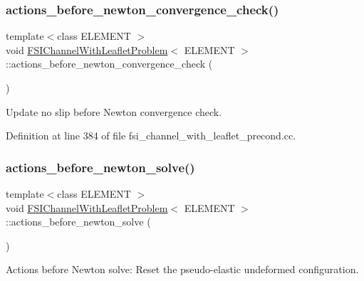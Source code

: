 \subsubsection{\texorpdfstring{actions\+\_\+before\+\_\+newton\+\_\+convergence\+\_\+check()}{actions\_before\_newton\_convergence\_check()}}
{\footnotesize\ttfamily template$<$class E\+L\+E\+M\+E\+NT $>$ \\
void \hyperlink{classFSIChannelWithLeafletProblem}{F\+S\+I\+Channel\+With\+Leaflet\+Problem}$<$ E\+L\+E\+M\+E\+NT $>$\+::actions\+\_\+before\+\_\+newton\+\_\+convergence\+\_\+check (\begin{DoxyParamCaption}{ }\end{DoxyParamCaption})\hspace{0.3cm}{\ttfamily [inline]}}



Update no slip before Newton convergence check. 



Definition at line 384 of file fsi\+\_\+channel\+\_\+with\+\_\+leaflet\+\_\+precond.\+cc.

\mbox{\label{classFSIChannelWithLeafletProblem_a8a32ef77f32b3283b4b509669deb0a11}} 
\subsubsection{\texorpdfstring{actions\+\_\+before\+\_\+newton\+\_\+solve()}{actions\_before\_newton\_solve()}}
{\footnotesize\ttfamily template$<$class E\+L\+E\+M\+E\+NT $>$ \\
void \hyperlink{classFSIChannelWithLeafletProblem}{F\+S\+I\+Channel\+With\+Leaflet\+Problem}$<$ E\+L\+E\+M\+E\+NT $>$\+::actions\+\_\+before\+\_\+newton\+\_\+solve (\begin{DoxyParamCaption}{ }\end{DoxyParamCaption})\hspace{0.3cm}{\ttfamily [inline]}}



Actions before Newton solve\+: Reset the pseudo-\/elastic undeformed configuration. 



